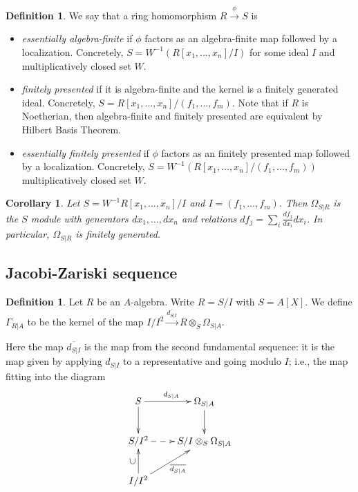 \documentclass{amsart}[12pt]
\numberwithin{equation}{section}
\theoremstyle{plain} %
\newtheorem{cor}[equation]{Corollary}
\theoremstyle{definition}
\newtheorem{defn}[equation]{Definition}
\theoremstyle{remark}
\newcommand{\xra}[1]{\xrightarrow{#1}}
\begin{document}
\begin{defn} We say that a ring homomorphism $R\xra{\phi} S$ is
\begin{itemize}
\item \emph{essentially algebra-finite} if $\phi$ factors as an algebra-finite map followed by a localization. Concretely, $S=W^{-1} (R[x_1,\dots,x_n]/I)$ for some ideal $I$ and multiplicatively closed set $W$.
\item \emph{finitely presented} if it is algebra-finite and the kernel is a finitely generated ideal. Concretely, $S=R[x_1,\dots,x_n]/(f_1,\dots,f_m)$. Note that if $R$ is Noetherian, then algebra-finite and finitely presented are equivalent by Hilbert Basis Theorem.
\item \emph{essentially finitely presented} if $\phi$ factors as an finitely presented map followed by a localization. Concretely, $S=W^{-1} (R[x_1,\dots,x_n]/(f_1,\dots,f_m))$ multiplicatively closed set $W$.
\end{itemize}
\end{defn}

\begin{cor} Let $S=W^{-1}R[x_1,\dots,x_n]/I$ and $I=(f_1,\dots,f_m)$. Then $\Omega_{S|R}$ is the $S$ module with generators $dx_1,\dots,dx_n$ and relations $df_j = \sum_i \frac{d f_j}{dx_i} dx_i$. In particular, $\Omega_{S|R}$ is finitely generated.
\end{cor} 

\subsection{Jacobi-Zariski sequence}

\begin{defn}
Let $R$ be an $A$-algebra. Write $R=S/I$ with $S=A[X]$. We define
 $\Gamma_{R|A}$ to be the kernel of the map $I/I^2 \xra{\overline{d_{S|I}}} R\otimes_S \Omega_{S|A}$.
\end{defn}

Here the map $\overline{d_{S|I}}$ is the map from the second fundamental sequence: it is the map given by applying $d_{S|I}$ to a representative and going modulo $I$; i.e., the map fitting into the diagram
 \[ \xymatrix{ S \ar[r]^{d_{S|A}} \ar[d] & \Omega_{S|A} \ar[d]\\
 S/I^2 \ar@{-->}[r] &  S/I \otimes_S \Omega_{S|A} \\
 I/I^2 \ar[u]^-{\rotatebox{90}{$\subset$}} \ar[ur]_{\overline{d_{S|A}}} & }\]
\end{document}
